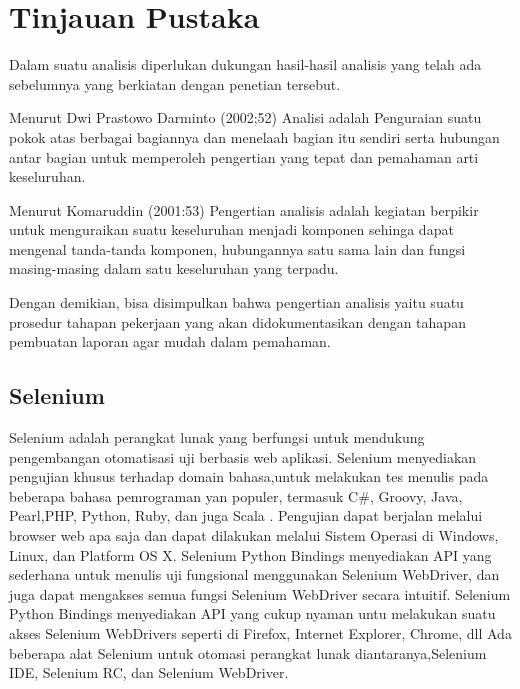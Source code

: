\chapter{Tinjauan Pustaka}

\par
Dalam suatu analisis diperlukan dukungan hasil-hasil analisis yang telah ada sebelumnya yang berkiatan dengan penetian tersebut.

Menurut Dwi Prastowo Darminto {(2002;52)} Analisi adalah Penguraian suatu pokok atas berbagai bagiannya dan menelaah bagian itu sendiri serta hubungan antar bagian untuk memperoleh pengertian yang tepat dan pemahaman arti keseluruhan.

Menurut Komaruddin {(2001:53)} Pengertian analisis adalah kegiatan berpikir untuk menguraikan suatu keseluruhan menjadi komponen sehinga dapat mengenal tanda-tanda komponen, hubungannya satu sama lain dan fungsi masing-masing dalam satu keseluruhan yang terpadu.

Dengan demikian, bisa disimpulkan bahwa pengertian analisis yaitu suatu prosedur tahapan pekerjaan yang akan didokumentasikan dengan tahapan pembuatan laporan agar mudah dalam pemahaman.

\section{Selenium}
Selenium adalah perangkat lunak yang berfungsi untuk mendukung
pengembangan otomatisasi uji berbasis web aplikasi. Selenium menyediakan pengujian khusus terhadap domain bahasa,untuk melakukan tes menulis pada beberapa bahasa pemrograman yan populer, termasuk C\#, Groovy, Java, Pearl,PHP, Python, Ruby, dan juga Scala \cite{razak2011agile}. Pengujian dapat berjalan melalui browser web apa saja dan dapat dilakukan melalui Sistem Operasi di Windows, Linux, dan Platform OS X. Selenium Python Bindings menyediakan API yang sederhana untuk menulis uji fungsional menggunakan Selenium WebDriver, dan juga dapat mengakses semua fungsi Selenium WebDriver secara intuitif. Selenium Python Bindings menyediakan API yang cukup nyaman untu melakukan suatu akses Selenium WebDrivers seperti di Firefox, Internet Explorer, Chrome, dll
Ada beberapa alat Selenium untuk otomasi perangkat lunak diantaranya,Selenium IDE, Selenium RC, dan Selenium WebDriver.

